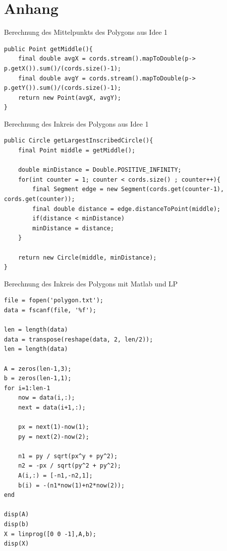 \documentclass[conference]{IEEEtran}
\begin{document}
	\section{Anhang}
Berechnung des Mittelpunkts des Polygons aus Idee 1
\begin{lstlisting}[basicstyle=\tiny]
public Point getMiddle(){
	final double avgX = cords.stream().mapToDouble(p-> p.getX()).sum()/(cords.size()-1);
	final double avgY = cords.stream().mapToDouble(p-> p.getY()).sum()/(cords.size()-1);
	return new Point(avgX, avgY);
}
\end{lstlisting}
Berechnung des Inkreis des Polygons aus Idee 1
\begin{lstlisting}[basicstyle=\tiny]
public Circle getLargestInscribedCircle(){
	final Point middle = getMiddle();
	
	double minDistance = Double.POSITIVE_INFINITY;
	for(int counter = 1; counter < cords.size() ; counter++){
		final Segment edge = new Segment(cords.get(counter-1), cords.get(counter));
		final double distance = edge.distanceToPoint(middle);
		if(distance < minDistance)
		minDistance = distance;
	}
	
	return new Circle(middle, minDistance);
}
\end{lstlisting} 
	Berechnung des Inkreis des Polygons mit Matlab und LP
\begin{lstlisting}[basicstyle=\small]
%file = fopen('testpolygon.txt');
file = fopen('polygon.txt');
data = fscanf(file, '%f');

len = length(data)
data = transpose(reshape(data, 2, len/2));
len = length(data)

A = zeros(len-1,3);
b = zeros(len-1,1);
for i=1:len-1
	now = data(i,:);
	next = data(i+1,:);
	
	px = next(1)-now(1);
	py = next(2)-now(2);
	
	n1 = py / sqrt(px^y + py^2);
	n2 = -px / sqrt(py^2 + py^2);
	A(i,:) = [-n1,-n2,1];
	b(i) = -(n1*now(1)+n2*now(2));
end

disp(A)
disp(b)
X = linprog([0 0 -1],A,b);
disp(X)
\end{lstlisting}  
\end{document}
